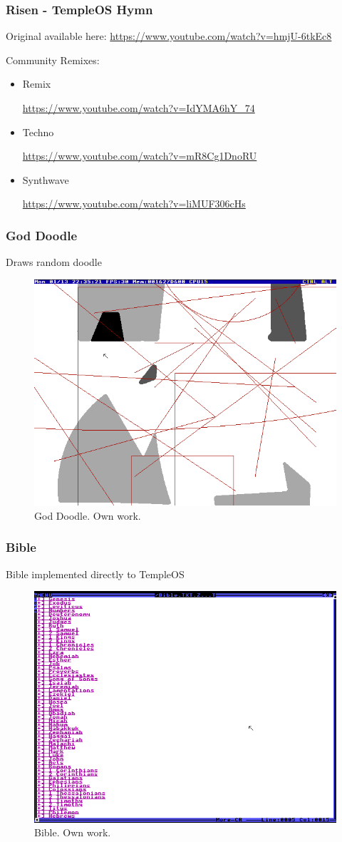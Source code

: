\documentclass{beamer}
\begin{document}
	\begin{frame}
		\frametitle{Risen - TempleOS Hymn}

		Original available here: \url{https://www.youtube.com/watch?v=hmjU-6tkEc8}

		\vspace{1em}

		Community Remixes:
		\begin{itemize}
			\item Remix

				\url{https://www.youtube.com/watch?v=IdYMA6hY_74}

			\item Techno

				\url{https://www.youtube.com/watch?v=mR8Cg1DnoRU}

			\item Synthwave

				\url{https://www.youtube.com/watch?v=liMUF306cHs}
		\end{itemize}
	\end{frame}

	\begin{frame}
		\frametitle{God Doodle}
		Draws random doodle
		\begin{figure}
			\centering
			\includegraphics[width=0.6\linewidth]{images/god_doodle.png}
			\caption{God Doodle. Own work.}
			\label{fig:gods_doodle}
		\end{figure}
	\end{frame}

	\begin{frame}
		\frametitle{Bible}
		Bible implemented directly to TempleOS
		\begin{figure}
			\centering
			\includegraphics[width=0.6\linewidth]{images/bible.png}
			\caption{Bible. Own work.}
			\label{fig:bible}
		\end{figure}
	\end{frame}
\end{document}
